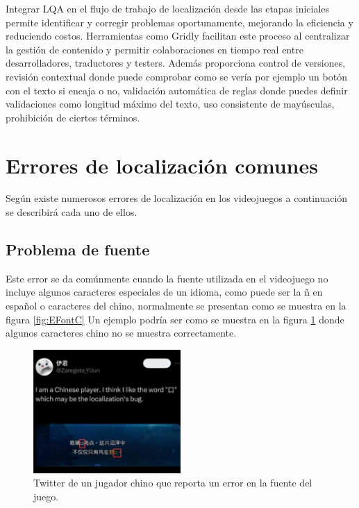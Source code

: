 Integrar LQA en el flujo de trabajo de localización desde las etapas iniciales permite identificar y corregir problemas oportunamente, mejorando la eficiencia y reduciendo costos. Herramientas como Gridly facilitan este proceso al centralizar la gestión de contenido y permitir colaboraciones en tiempo real entre desarrolladores, traductores y testers. Además proporciona control de versiones, revisión contextual donde puede comprobar como se vería por ejemplo un botón con el texto si encaja o no, validación automática de reglas donde puedes definir validaciones como longitud máximo del texto, uso consistente de mayúsculas, prohibición de ciertos términos.



\section{Errores de localización comunes}
\label{sec:Errores de localizacion}
Según \cite{LQAPSM2017} existe numerosos errores de localización en los videojuegos a continuación se describirá cada uno de ellos.

\subsection{Problema de fuente} \label{ErrorFuente}
Este error se da comúnmente cuando la fuente utilizada en el videojuego no incluye algunos caracteres especiales de un idioma, como puede ser la ñ en español o caracteres del chino, normalmente se presentan como se muestra en la figura \ref{fig:EFontC}
Un ejemplo podría ser como se muestra en la figura \ref{fig:EFont} donde algunos caracteres chino no se muestra correctamente. 

\begin{figure}[H]
	\centering
	\includegraphics[width = 0.5\textwidth]{Imagenes/Errores_Localizacion/E_Font.png}
	\caption{Twitter de un jugador chino que reporta un error en la fuente del juego.}
	\label{fig:EFont}
\end{figure}

